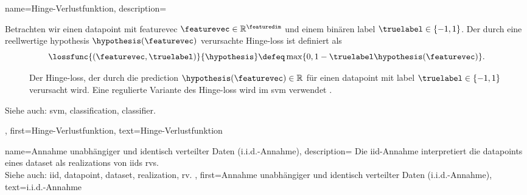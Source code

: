 {{{{
{
name={Hinge-Verlustfunktion}, 
description={
Betrachten wir einen \gls{datapoint} mit \gls{featurevec} $\featurevec \in \mathbb{R}^{\featuredim}$ und einem binären \gls{label} $\truelabel \in \{-1,1\}$. Der durch eine reellwertige \gls{hypothesis} $\hypothesis(\featurevec)$ verursachte Hinge-\gls{loss} ist definiert als
\begin{equation} 
\label{equ_hinge_loss_gls_dict_de}
\lossfunc{(\featurevec,\truelabel)}{\hypothesis} \defeq \max \{ 0 , 1 - \truelabel \hypothesis(\featurevec) \}. 
\end{equation}
\begin{figure}[H]
\begin{center}
\caption{Der Hinge-\gls{loss}, der durch die \gls{prediction} $\hypothesis(\featurevec) \in \mathbb{R}$ für einen \gls{datapoint} mit \gls{label} $\truelabel \in \{-1,1\}$ verursacht wird. Eine regulierte Variante des Hinge-\gls{loss} wird im \gls{svm} verwendet \cite{LampertNowKernel}.}
\label{fig_hingeloss_dict_de}
\end{center}
\end{figure} 	    
Siehe auch: \gls{svm}, \gls{classification}, \gls{classifier}.
},
first={Hinge-Verlustfunktion},
text={Hinge-Verlustfunktion}
}

{
name={Annahme unabhängiger und identisch verteilter Daten (i.i.d.-Annahme)}, 
description={
Die \gls{iid}-Annahme interpretiert die \glspl{datapoint} eines \gls{dataset} als \glspl{realization} von \glspl{iid} \glspl{rv}.\\
Siehe auch: \gls{iid}, \gls{datapoint}, \gls{dataset}, \gls{realization}, \gls{rv}.
},
first={Annahme unabhängiger und identisch verteilter Daten (i.i.d.-Annahme)},
text={i.i.d.-Annahme}
}

}}}}
